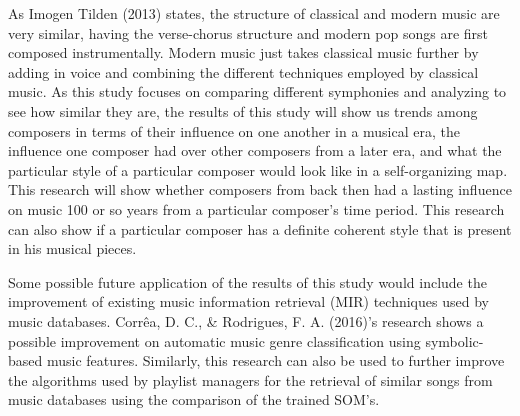 As Imogen Tilden (2013) states, the structure of classical and modern music are very similar, having the verse-chorus structure and modern pop songs are first composed instrumentally. Modern music just takes classical music further by adding in voice and combining the different techniques employed by classical music. As this study focuses on comparing different symphonies and analyzing to see how similar they are, the results of this study will show us trends among composers in terms of their influence on one another in a musical era, the influence one composer had over other composers from a later era, and what the particular style of a particular composer would look like in a self-organizing map. This research will show whether composers from back then had a lasting influence on music 100 or so years from a particular composer’s time period. This research can also show if a particular composer has a definite coherent style that is present in his musical pieces.

Some possible future application of the results of this study would include the improvement of existing music information retrieval (MIR) techniques used by music databases. Corrêa, D. C., \& Rodrigues, F. A. (2016)’s research shows a possible improvement on automatic music genre classification using symbolic-based music features. Similarly, this research can also be used to further improve the algorithms used by playlist managers for the retrieval of similar songs from music databases using the comparison of the trained SOM’s.


